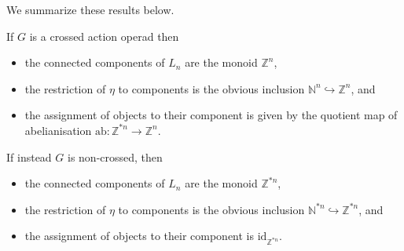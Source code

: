 \documentclass{amsbook} %
\newcommand{\ELn}{E\Lambda(\underline{n})}
\newenvironment{eq*}{\begin{equation*}}{\end{equation*}}
\numberwithin{section}{chapter}
\begin{document}
We summarize these results below.
\begin{cor}\label{crossconcomp} If $G$ is a crossed action operad then
\begin{itemize} 
\item the connected components of $L_n$ are the monoid $\mathbb{Z}^n$,
\item the restriction of $\eta$ to components is the obvious inclusion $\mathbb{N}^n \hookrightarrow \mathbb{Z}^n$, and
\item the assignment of objects to their component is given by the quotient map of abelianisation $\mathrm{ab}: \mathbb{Z}^{\ast n} \to \mathbb{Z}^n$.
\end{itemize}
If instead $G$ is non-crossed, then
\begin{itemize} \itemsep0em
\item the connected components of $L_n$ are the monoid $\mathbb{Z}^{\ast n}$,
\item the restriction of $\eta$ to components is the obvious inclusion $\mathbb{N}^{\ast n} \hookrightarrow \mathbb{Z}^{\ast n}$, and
\item the assignment of objects to their component is $\mathrm{id}_{\mathbb{Z}^{\ast n}}$.
\end{itemize}
\end{cor}
\end{document}
